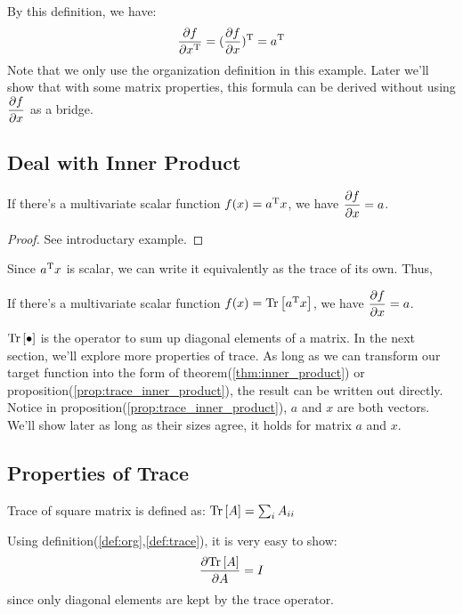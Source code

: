 \begin{myex}
\label{ex:tran_x}
By this definition, we have:
\begin{equation}
	\dfrac{\partial f}{\partial x^\mathrm{T}} = (\dfrac{\partial f}{\partial x})^\mathrm{T} = a^\mathrm{T}
\end{equation}
Note that we only use the organization definition in this example. 
Later we'll show that with some matrix properties, this formula 
can be derived without using $\dfrac{\partial f}{\partial x}$ as a bridge. 
\end{myex}

\subsection{Deal with Inner Product}

\begin{mythm}
	\label{thm:inner_product}
	If there's a multivariate scalar function $f(x) = a^\mathrm{T}x$, 
	we have $\dfrac{\partial f}{\partial x} = a$.
\end{mythm}

\begin{proof}
See introductary example. 
\end{proof}

Since $a^\mathrm{T}x$ is scalar, we can write it equivalently as the 
trace of its own. Thus, 
\begin{myprop}
	\label{prop:trace_inner_product}
	If there's a multivariate scalar function $f(x) = \mathrm{Tr}\left[a^\mathrm{T}x\right]$, 
	we have $\dfrac{\partial f}{\partial x} = a$.
\end{myprop}

$\mathrm{Tr}\left[\bullet\right]$ is the operator to sum up diagonal elements of a matrix. 
In the next section, we'll explore more properties of trace. 
As long as we can transform our target function into the form of 
theorem(\ref{thm:inner_product}) or proposition(\ref{prop:trace_inner_product}), 
the result can be written out directly. Notice in 
proposition(\ref{prop:trace_inner_product}), $a$ and $x$ are both vectors. 
We'll show later as long as their sizes agree, it holds for matrix $a$ and $x$. 

\subsection{Properties of Trace}

\begin{mydef}
\label{def:trace}
Trace of square matrix is defined as: $\mathrm{Tr}\left[A\right] = \sum_{i}{A_{ii}}$
\end{mydef}

\begin{myex}
	Using definition(\ref{def:org},\ref{def:trace}), it is very easy to show:
	\begin{equation}
		\dfrac{\partial \mathrm{Tr}\left[A\right]}{\partial A} = I
	\end{equation}
	since only diagonal elements are kept by the trace operator. 
\end{myex}

